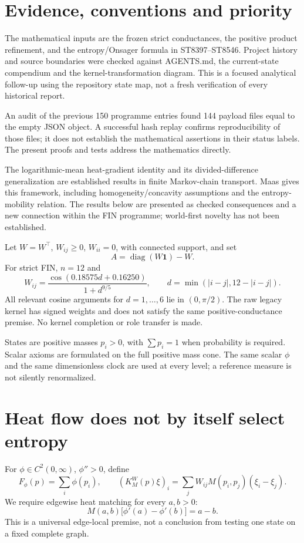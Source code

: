 \documentclass[11pt,a4paper]{article}
\newcommand{\one}{\mathbf1}
\begin{document}
\tableofcontents
\newpage
\section{Evidence, conventions and priority}

The mathematical inputs are the frozen strict conductances, the positive
product refinement, and the entropy/Onsager formula in ST8397--ST8546.
Project history and source boundaries were checked against AGENTS.md, the
current-state compendium and the kernel-transformation diagram. This is a
focused analytical follow-up using the repository state map, not a fresh
verification of every historical report.

An audit of the previous 150 programme entries found 144 payload files equal
to the empty JSON object. A successful hash replay confirms reproducibility of
those files; it does not establish the mathematical assertions in their
status labels. The present proofs and tests address the mathematics directly.

The logarithmic-mean heat-gradient identity and its divided-difference
generalization are established results in finite Markov-chain transport.
Maas \cite{maas} gives this framework, including homogeneity/concavity
assumptions and the entropy-mobility relation. The results below are presented
as checked consequences and a new connection within the FIN programme;
world-first novelty has not been established.

Let \(W=W^\top\), \(W_{ij}\ge0\), \(W_{ii}=0\), with connected support, and set
\[
A=\operatorname{diag}(W\one)-W.
\]
For strict FIN, \(n=12\) and
\[
W_{ij}=\frac{\cos(0.18575d+0.16250)}{1+d^{9/5}},\qquad
d=\min(|i-j|,12-|i-j|).
\]
All relevant cosine arguments for \(d=1,\ldots,6\) lie in \((0,\pi/2)\).
The raw legacy kernel has signed weights and does not satisfy the same
positive-conductance premise. No kernel completion or role transfer is made.

States are positive masses \(p_i>0\), with \(\sum p_i=1\) when probability is
required. Scalar axioms are formulated on the full positive mass cone.
The same scalar \(\phi\) and the same dimensionless clock are used at every
level; a reference measure is not silently renormalized.

\section{Heat flow does not by itself select entropy}

For \(\phi\in C^2(0,\infty)\), \(\phi''>0\), define
\[
F_\phi(p)=\sum_i\phi(p_i),\qquad
(K_M^W(p)\xi)_i=\sum_jW_{ij}M(p_i,p_j)(\xi_i-\xi_j).
\]
We require edgewise heat matching for every \(a,b>0\):
\begin{equation}
M(a,b)\big[\phi'(a)-\phi'(b)\big]=a-b. \label{match}
\end{equation}
This is a universal edge-local premise, not a conclusion from testing one
state on a fixed complete graph.
\end{document}
